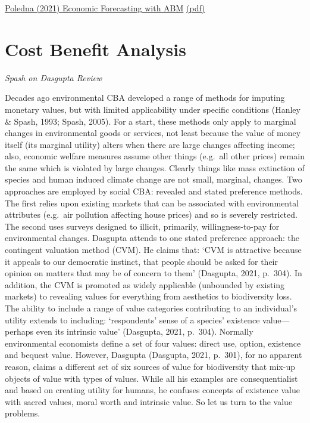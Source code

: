 \documentclass[
]{book}
\begin{document}
\href{https://www.rebuildingmacroeconomics.ac.uk/research-prize-complexity-macro}{Poledna (2021) Economic Forecasting with ABM}
\href{pdf/Poledna_2021_Economic_Forecasting_ABM.pdf}{(pdf)}

\hypertarget{cost-benefit-analysis}{%
\chapter{Cost Benefit Analysis}\label{cost-benefit-analysis}}

\emph{Spash on Dasgupta Review}

Decades ago environmental CBA developed a range of methods for imputing monetary values, but
with limited applicability under specific conditions (Hanley \& Spash, 1993; Spash, 2005). For a
start, these methods only apply to marginal changes in environmental goods or services, not
least because the value of money itself (its marginal utility) alters when there are large changes
affecting income; also, economic welfare measures assume other things (e.g.~all other prices) remain
the same which is violated by large changes. Clearly things like mass extinction of species and
human induced climate change are not small, marginal, changes.
Two approaches are employed by social CBA: revealed and stated preference methods. The first relies
upon existing markets that can be associated with environmental attributes (e.g.~air pollution affecting
house prices) and so is severely restricted. The second uses surveys designed to illicit, primarily,
willingness-to-pay for environmental changes. Dasgupta attends to one stated preference approach: the
contingent valuation method (CVM). He claims that: `CVM is attractive because it appeals to our
democratic instinct, that people should be asked for their opinion on matters that may be of concern
to them' (Dasgupta, 2021, p.~304). In addition, the CVM is promoted as widely applicable (unbounded
by existing markets) to revealing values for everything from aesthetics to biodiversity loss. The ability to
include a range of value categories contributing to an individual's utility extends to including:
`respondents' sense of a species' existence value---perhaps even its intrinsic value' (Dasgupta, 2021, p.~304).
Normally environmental economists define a set of four values: direct use, option, existence and bequest
value. However, Dasgupta (Dasgupta, 2021, p.~301), for no apparent reason, claims a different set of
six sources of value for biodiversity that mix-up objects of value with types of values. While all his
examples are consequentialist and based on creating utility for humans, he confuses concepts of
existence value with sacred values, moral worth and intrinsic value. So let us turn to the value problems.
\end{document}
